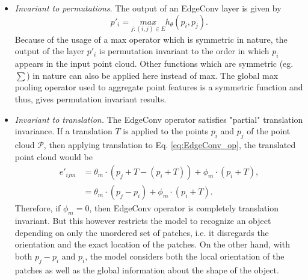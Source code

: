 \begin{itemize}
    \item \textit{Invariant to permutations}. The output of an EdgeConv layer is given by
    \begin{equation}
        \label{eq:EdgeConv_perm}
        p'_{i} = \underset{j:(i,j) \in E}{max}h_{\theta}(p_i,p_j). 
    \end{equation}
    Because of the usage of a max operator which is symmetric in nature, the output of the layer $p'_{i}$ is permutation invariant to the order in which $p_i$ appears in the input point cloud. Other functions which are symmetric (eg. $\sum$) in nature can also be applied here instead of max. The global max pooling operator used to aggregate point features is a symmetric function and thus, gives permutation invariant results.
    \item \textit{Invariant to translation.} The EdgeConv operator satisfies "partial" translation invariance. If a translation $T$ is applied to the points $p_i$ and $p_j$ of the point cloud $\mathcal{P}$, then applying translation to Eq. \ref{eq:EdgeConv_op}, the translated point cloud would be 
    \begin{equation}
        \label{eq:EdgeConv_trans}
        \begin{split}
            e'_{ijm} &= \theta _m \cdot (p_j + T - (p_i + T)) + \phi _m \cdot (p_i + T),\\
            &= \theta _m \cdot (p_j - p_i) + \phi _m \cdot (p_i + T).
        \end{split}    
    \end{equation}
    Therefore, if $\phi _m =0$, then EdgeConv operator is completely translation invariant. But this however restricts the model to recognize an object depending on only the unordered set of patches, i.e. it disregards the orientation and the exact location of the patches. On the other hand, with both $p_j-p_i$ and $p_i$, the model considers both the local orientation of the patches as well as the global information about the shape of the object. 
\end{itemize}

